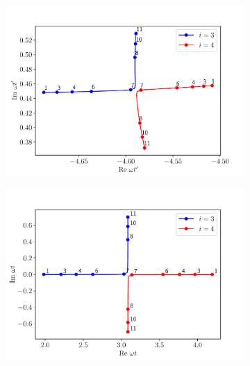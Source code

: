 \begin{figure}
\begin{subfigure}[b]{0.33\linewidth}
\end{subfigure}
\begin{subfigure}[b]{0.33\linewidth}
  \includegraphics[width=\textwidth]{figures/ch_ATI_SPA/rescattering/start34.pdf}
\end{subfigure}
\begin{subfigure}[b]{0.33\linewidth}
  \includegraphics[width=\textwidth]{figures/ch_ATI_SPA/rescattering/return34.pdf}
\end{subfigure}
\begin{subfigure}[b]{0.33\linewidth}

\end{subfigure}
\end{figure}
